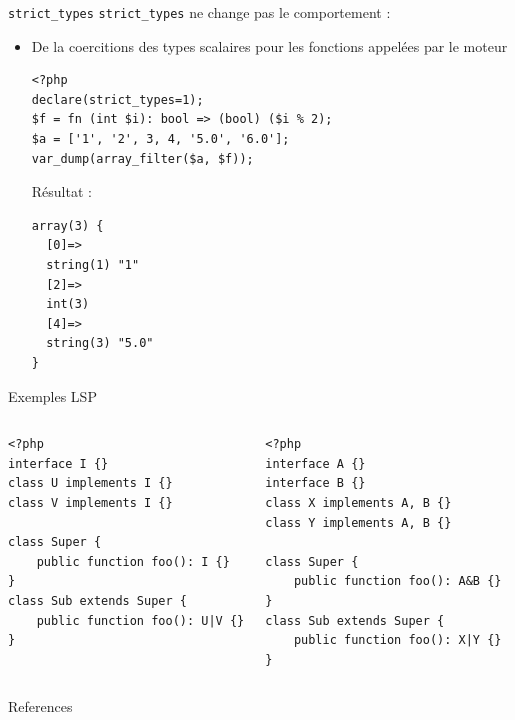 \documentclass[10pt]{beamer}
\begin{document}
\begin{frame}[fragile]{\texttt{strict\_types}}
    \texttt{strict\_types} ne change \alert{pas} le comportement :

    \begin{itemize}
        \item De la coercitions des types scalaires pour les fonctions appelées par le moteur
            \begin{verbatim}
<?php
declare(strict_types=1);
$f = fn (int $i): bool => (bool) ($i % 2);
$a = ['1', '2', 3, 4, '5.0', '6.0'];
var_dump(array_filter($a, $f));
            \end{verbatim}
            Résultat :
            \begin{verbatim}
array(3) {
  [0]=>
  string(1) "1"
  [2]=>
  int(3)
  [4]=>
  string(3) "5.0"
}
            \end{verbatim}
    \end{itemize}
\end{frame}

\begin{frame}[fragile]{Exemples LSP}
    \begin{columns}[T,onlytextwidth]
    \begin{verbatim}
<?php
interface I {}
class U implements I {}
class V implements I {}

class Super {
    public function foo(): I {}
}
class Sub extends Super {
    public function foo(): U|V {}
}
    \end{verbatim}
    \begin{verbatim}
<?php
interface A {}
interface B {}
class X implements A, B {}
class Y implements A, B {}

class Super {
    public function foo(): A&B {}
}
class Sub extends Super {
    public function foo(): X|Y {}
}
    \end{verbatim}
    \end{columns}
\end{frame}

\begin{frame}[allowframebreaks]{References}

  \printbibliography

\end{frame}
\end{document}
